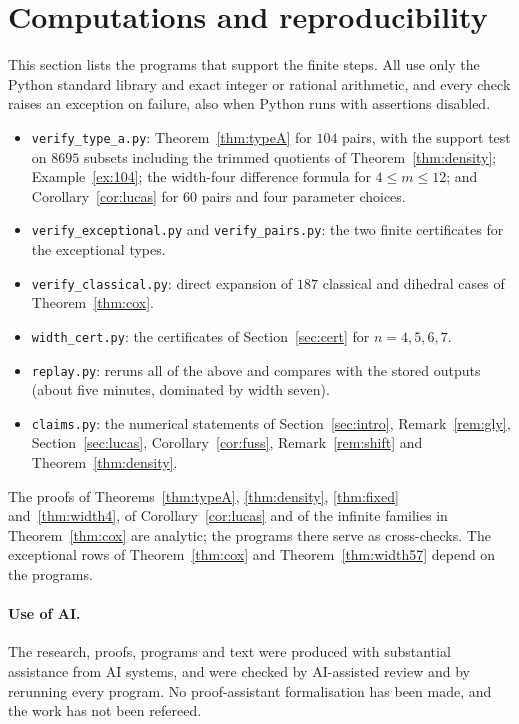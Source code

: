 \documentclass[11pt,a4paper]{article}
\theoremstyle{definition}\newtheorem{definition}[theorem]{Definition}
\theoremstyle{remark}\newtheorem{remark}[theorem]{Remark}\newtheorem{example}[theorem]{Example}
\numberwithin{equation}{section}
\begin{document}
\section{Computations and reproducibility}\label{sec:repro}
This section lists the programs that support the finite steps. All use only the Python standard library and exact integer or rational arithmetic, and every check raises an exception on failure, also when Python runs with assertions disabled.
\begin{itemize}
\item \texttt{verify\_type\_a.py}: Theorem~\ref{thm:typeA} for $104$ pairs, with the support test on $8695$ subsets including the trimmed quotients of Theorem~\ref{thm:density}; Example~\ref{ex:104}; the width-four difference formula for $4\le m\le12$; and Corollary~\ref{cor:lucas} for $60$ pairs and four parameter choices.
\item \texttt{verify\_exceptional.py} and \texttt{verify\_pairs.py}: the two finite certificates for the exceptional types.
\item \texttt{verify\_classical.py}: direct expansion of $187$ classical and dihedral cases of Theorem~\ref{thm:cox}.
\item \texttt{width\_cert.py}: the certificates of Section~\ref{sec:cert} for $n=4,5,6,7$.
\item \texttt{replay.py}: reruns all of the above and compares with the stored outputs (about five minutes, dominated by width seven).
\item \texttt{claims.py}: the numerical statements of Section~\ref{sec:intro}, Remark~\ref{rem:gly}, Section~\ref{sec:lucas}, Corollary~\ref{cor:fuss}, Remark~\ref{rem:shift} and Theorem~\ref{thm:density}.
\end{itemize}
The proofs of Theorems~\ref{thm:typeA}, \ref{thm:density}, \ref{thm:fixed} and~\ref{thm:width4}, of Corollary~\ref{cor:lucas} and of the infinite families in Theorem~\ref{thm:cox} are analytic; the programs there serve as cross-checks. The exceptional rows of Theorem~\ref{thm:cox} and Theorem~\ref{thm:width57} depend on the programs.

\paragraph{Use of AI.} The research, proofs, programs and text were produced with substantial assistance from AI systems, and were checked by AI-assisted review and by rerunning every program. No proof-assistant formalisation has been made, and the work has not been refereed.
\end{document}
